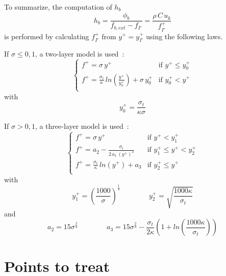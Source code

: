 \newpage
To summarize, the computation of $h_b$
\begin{equation}
h_b=\displaystyle\frac{\phi_b}{f_{b,ext}-f_{I'}}=\frac{\rho\,C\,u_k}{f^+_{I'}}
\end{equation}
is performed by calculating  $f^+_{I'}$ from $y^+=y^+_{I'}$
using the following laws.

If $\sigma\leqslant 0,1$, a two-layer model is used~:
\begin{equation}
\left\{
\begin{array}{ll}
f^+ = \sigma \,y^+ & \text{if } y^+ \leqslant y^+_0 \\
f^+ = \displaystyle\frac{\sigma_t}{\kappa}\,
        ln\left(\displaystyle\frac{y^+}{y^+_0}\right)+\sigma \,y^+_0
                   & \text{if } y^+_0 < y^+\\
\end{array}
\right.
\end{equation}
with
\begin{equation}
y^+_0= \displaystyle\frac{\sigma_t}{\kappa\sigma}
\end{equation}


If $\sigma > 0,1$, a three-layer model is used~:
\begin{equation}
\left\{
\begin{array}{ll}
f^+ = \sigma \,y^+ & \text{if } y^+ < y^+_1 \\
f^+ = a_2 -\displaystyle\frac{\sigma_t}{2\,a_1\,(y^+)^2}& \text{if } y_1^+ \leqslant y^+ < y_2^+ \\
f^+ = \displaystyle\frac{\sigma_t}{\kappa}\,ln(y^+)+a_3& \text{if } y^+_2 \leqslant y^+\\
\end{array}
\right.
\end{equation}
with
\begin{equation}
  y^+_1 =\left(\displaystyle\frac{1000}{\sigma}\right)^\frac{1}{3} \qquad\qquad
  y^+_2 = \sqrt{\displaystyle\frac{1000\kappa}{\sigma_t}}
\end{equation}
and
\begin{equation}
a_2=15\sigma^{\frac{2}{3}}\qquad\qquad
a_3=15\sigma^{\frac{2}{3}}-\displaystyle\frac{\sigma_t}{2\kappa}
\left(1+
ln\left(\displaystyle\frac{1000\kappa}{\sigma_t}\right)\right)
\end{equation}

\newpage
\section*{Points to treat}


